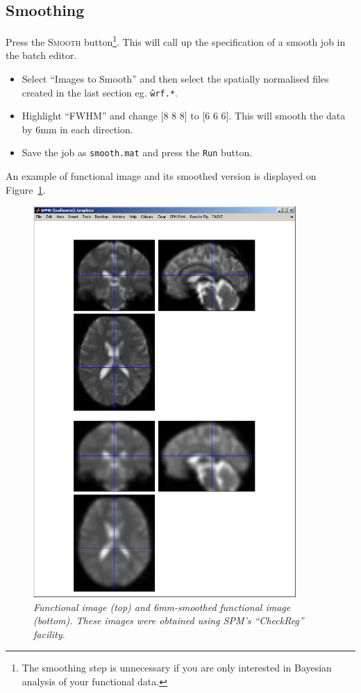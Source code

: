 \subsection{Smoothing}

Press the \textsc{Smooth} button\footnote{The smoothing step is unnecessary if you are only interested in Bayesian analysis of your functional data.}. This will call up the specification of a smooth job in the batch editor.

\begin{itemize}
\item Select ``Images to Smooth'' and then select the spatially normalised files created in the last section eg. \texttt{\^wrf.*}.
\item Highlight ``FWHM'' and change [8 8 8] to [6 6 6]. This will smooth the data by 6mm in each direction.
\item Save the job as \texttt{smooth.mat} and press the \texttt{Run} button.
\end{itemize}

An example of functional image and its smoothed version is displayed on Figure~\ref{aud_smooth}.

\begin{figure}
\begin{center}
\includegraphics[width=100mm]{auditory/smooth}
\caption{\em Functional image (top) and 6mm-smoothed functional image (bottom). These images were obtained using SPM's ``CheckReg'' facility. \label{aud_smooth}}
\end{center}
\end{figure}

